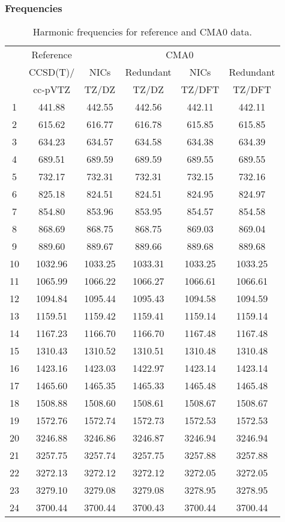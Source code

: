 \documentclass[10pt,oneside]{article}
\begin{document}
\begin{table}[h!]
\subsubsection*{Frequencies}
\centering
\caption{Harmonic frequencies for reference and CMA0 data.}
\begin{tabular}{cccccc}
\toprule
{} & Reference & \multicolumn{4}{c}{CMA0} \\
{} &  CCSD(T)/ &    NICs &  Redundant &    NICs & Redundant \\
{} &   cc-pVTZ &   TZ/DZ &      TZ/DZ &  TZ/DFT &    TZ/DFT \\
\midrule
1  &    441.88 &  442.55 &     442.56 &  442.11 &    442.11 \\
2  &    615.62 &  616.77 &     616.78 &  615.85 &    615.85 \\
3  &    634.23 &  634.57 &     634.58 &  634.38 &    634.39 \\
4  &    689.51 &  689.59 &     689.59 &  689.55 &    689.55 \\
5  &    732.17 &  732.31 &     732.31 &  732.15 &    732.16 \\
6  &    825.18 &  824.51 &     824.51 &  824.95 &    824.97 \\
7  &    854.80 &  853.96 &     853.95 &  854.57 &    854.58 \\
8  &    868.69 &  868.75 &     868.75 &  869.03 &    869.04 \\
9  &    889.60 &  889.67 &     889.66 &  889.68 &    889.68 \\
10 &   1032.96 & 1033.25 &    1033.31 & 1033.25 &   1033.25 \\
11 &   1065.99 & 1066.22 &    1066.27 & 1066.61 &   1066.61 \\
12 &   1094.84 & 1095.44 &    1095.43 & 1094.58 &   1094.59 \\
13 &   1159.51 & 1159.42 &    1159.41 & 1159.14 &   1159.14 \\
14 &   1167.23 & 1166.70 &    1166.70 & 1167.48 &   1167.48 \\
15 &   1310.43 & 1310.52 &    1310.51 & 1310.48 &   1310.48 \\
16 &   1423.16 & 1423.03 &    1422.97 & 1423.14 &   1423.14 \\
17 &   1465.60 & 1465.35 &    1465.33 & 1465.48 &   1465.48 \\
18 &   1508.88 & 1508.60 &    1508.61 & 1508.67 &   1508.67 \\
19 &   1572.76 & 1572.74 &    1572.73 & 1572.53 &   1572.53 \\
20 &   3246.88 & 3246.86 &    3246.87 & 3246.94 &   3246.94 \\
21 &   3257.75 & 3257.74 &    3257.75 & 3257.88 &   3257.88 \\
22 &   3272.13 & 3272.12 &    3272.12 & 3272.05 &   3272.05 \\
23 &   3279.10 & 3279.08 &    3279.08 & 3278.95 &   3278.95 \\
24 &   3700.44 & 3700.44 &    3700.43 & 3700.44 &   3700.44 \\
\bottomrule
\end{tabular}
\end{table}
\end{document}
